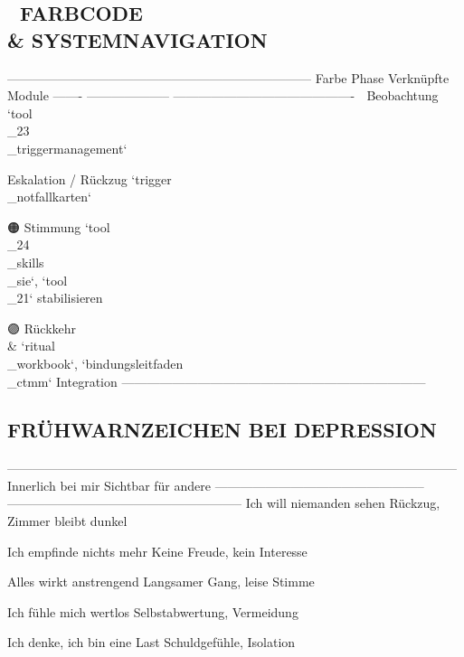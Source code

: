 \subsection{🎨 FARBCODE \\& SYSTEMNAVIGATION}

------------------------------------------------------------------------
Farbe   Phase                Verknüpfte Module
------- -------------------- -------------------------------------------
🔵      Beobachtung          `tool\\_23\\_triggermanagement`

\textcolor{ctmmRed}{\faCircle}      Eskalation / Rückzug `trigger\\_notfallkarten`

🟠      Stimmung             `tool\\_24\\_skills\\_sie`, `tool\\_21`
stabilisieren

🟣      Rückkehr \\&           `ritual\\_workbook`, `bindungsleitfaden\\_ctmm`
Integration
------------------------------------------------------------------------

\subsection{\textcolor{ctmmBlue}{\faPuzzlePiece} FRÜHWARNZEICHEN BEI DEPRESSION}

-----------------------------------------------------------------------------------------------------------
Innerlich bei mir                                  Sichtbar für andere
-------------------------------------------------- --------------------------------------------------------
Ich will niemanden sehen                           Rückzug, Zimmer bleibt dunkel

Ich empfinde nichts mehr                           Keine Freude, kein Interesse

Alles wirkt anstrengend                            Langsamer Gang, leise Stimme

Ich fühle mich wertlos                             Selbstabwertung, Vermeidung

Ich denke, ich bin eine Last                       Schuldgefühle, Isolation

